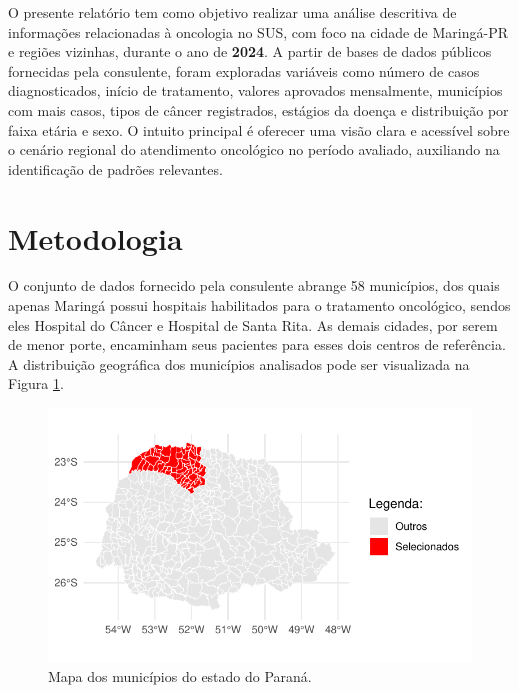 \documentclass[a4paper]{modeloLEA} %
\begin{document}
O presente relatório tem como objetivo realizar uma análise descritiva de informações relacionadas à oncologia no SUS, com foco na cidade de Maringá-PR e regiões vizinhas, durante o ano de \textbf{2024}. A partir de bases de dados públicos fornecidas pela consulente, foram exploradas variáveis como número de casos diagnosticados, início de tratamento, valores aprovados mensalmente, municípios com mais casos, tipos de câncer registrados, estágios da doença e distribuição por faixa etária e sexo. O intuito principal é oferecer uma visão clara e acessível sobre o cenário regional do atendimento oncológico no período avaliado, auxiliando na identificação de padrões relevantes.

\section{Metodologia}\label{metodologia}

O conjunto de dados fornecido pela consulente abrange 58 municípios, dos quais apenas Maringá possui hospitais habilitados para o tratamento oncológico, sendos eles Hospital do Câncer e Hospital de Santa Rita. As demais cidades, por serem de menor porte, encaminham seus pacientes para esses dois centros de referência. A distribuição geográfica dos municípios analisados pode ser visualizada na Figura \ref{fig:mapa}.

\begin{figure}[h]

{\centering \includegraphics{relatorio_files/figure-latex/mapa-1} 

}

\caption{\label{fig:mapa}Mapa dos municípios do estado do Paraná.}\label{fig:mapa}
\end{figure}
\end{document}
